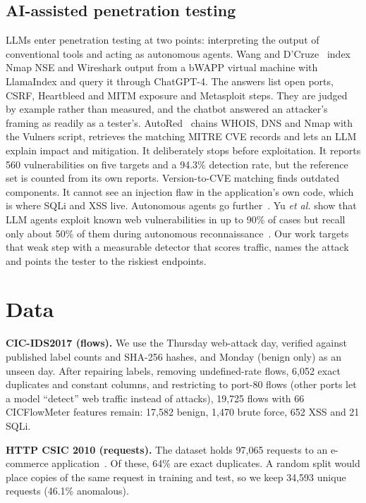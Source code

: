 \documentclass[conference]{IEEEtran}
\begin{document}
\subsection{AI-assisted penetration testing}
LLMs enter penetration testing at two points: interpreting the output of conventional tools and
acting as autonomous agents. Wang and D'Cruze~\cite{wang2024} index Nmap NSE and Wireshark output
from a bWAPP virtual machine with LlamaIndex and query it through ChatGPT-4. The answers list open
ports, CSRF, Heartbleed and MITM exposure and Metasploit steps. They are judged by example rather
than measured, and the chatbot answered an attacker's framing as readily as a tester's.
AutoRed~\cite{khairmode2026} chains WHOIS, DNS and Nmap with the Vulners script, retrieves
the matching MITRE CVE records and lets an LLM explain impact and mitigation. It deliberately
stops before exploitation. It reports 560 vulnerabilities on five targets and a 94.3\% detection
rate, but the reference set is counted from its own reports. Version-to-CVE matching finds outdated
components. It cannot see an injection flaw in the application's own code, which is where SQLi
and XSS live.
Autonomous agents go further~\cite{deng2024,shen2025}. Yu \emph{et al.} show that LLM agents
exploit known web vulnerabilities in up to 90\% of cases but recall only about 50\% of them during
autonomous reconnaissance~\cite{yu2026}. Our work targets that weak step with a measurable
detector that scores traffic, names the attack and points the tester to the riskiest endpoints.

\section{Data}
\textbf{CIC-IDS2017 (flows).} We use the Thursday web-attack day, verified against published
label counts and SHA-256 hashes, and Monday (benign only) as an unseen day. After repairing labels,
removing undefined-rate flows, 6,052 exact duplicates and constant columns, and restricting to
port-80 flows (other ports let a model ``detect'' web traffic instead of attacks), 19,725 flows with
66 CICFlowMeter features remain: 17,582 benign, 1,470 brute force, 652 XSS and 21 SQLi.

\textbf{HTTP CSIC 2010 (requests).} The dataset holds 97,065 requests to an e-commerce
application~\cite{csic2010}. Of these, 64\% are exact duplicates. A random split would place copies of the same
request in training and test, so we keep 34,593 unique requests (46.1\% anomalous).
\end{document}
